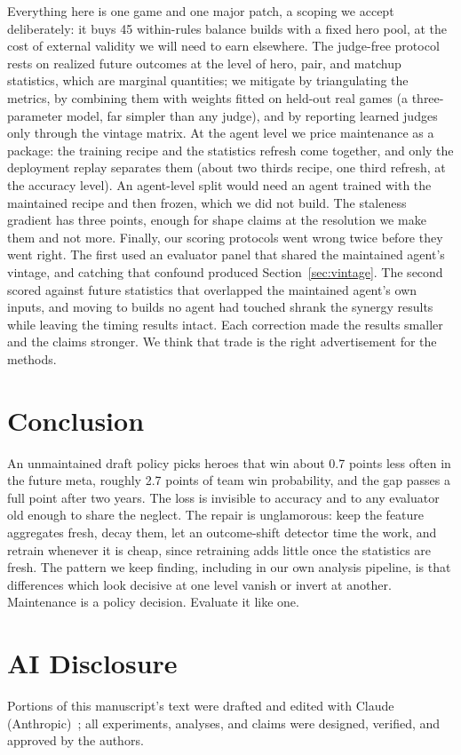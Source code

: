 \documentclass[journal]{IEEEtran}
\newif\ifanonymous
\begin{document}
Everything here is one game and one major patch, a scoping we accept
deliberately: it buys 45 within-rules balance builds with a fixed hero
pool, at the cost of external validity we will need to earn elsewhere.
The judge-free protocol rests on realized future outcomes at the level
of hero, pair, and matchup statistics, which are marginal quantities; we
mitigate by triangulating the metrics, by combining them with weights
fitted on held-out real games (a three-parameter model, far simpler than
any judge), and by reporting learned judges only through the vintage
matrix. At the agent level we price maintenance as a package: the
training recipe and the statistics refresh come together, and only the
deployment replay separates them (about two thirds recipe, one third
refresh, at the accuracy level). An agent-level split would need an
agent trained with the maintained recipe and then frozen, which we did
not build. The staleness gradient has three points, enough for shape
claims at the resolution we make them and not more. Finally, our
scoring protocols went wrong twice before they went right. The first
used an evaluator panel that shared the maintained agent's vintage, and
catching that confound produced Section~\ref{sec:vintage}. The second
scored against future statistics that overlapped the maintained
agent's own inputs, and moving to builds no agent had touched shrank
the synergy results while leaving the timing results intact. Each
correction made the results smaller and the claims stronger. We think
that trade is the right advertisement for the methods.

\section{Conclusion}

An unmaintained draft policy picks heroes that win about 0.7 points
less often in the future meta, roughly 2.7 points of team win
probability, and the gap passes a full point after two years. The loss
is invisible to accuracy and to any evaluator old enough to share the
neglect. The repair is unglamorous: keep the feature aggregates fresh,
decay them, let an outcome-shift detector time the work, and retrain
whenever it is cheap, since retraining adds little once the statistics
are fresh. The pattern we keep finding, including in our own analysis
pipeline, is that differences which look decisive at one level vanish
or invert at another. Maintenance is a policy decision. Evaluate it
like one.

\ifanonymous
\section*{AI Disclosure}
Portions of this manuscript's text were drafted and edited with Claude
(Anthropic)~\cite{claude}; all experiments, analyses, and claims were
designed, verified, and approved by the authors.
\else
\end{document}

